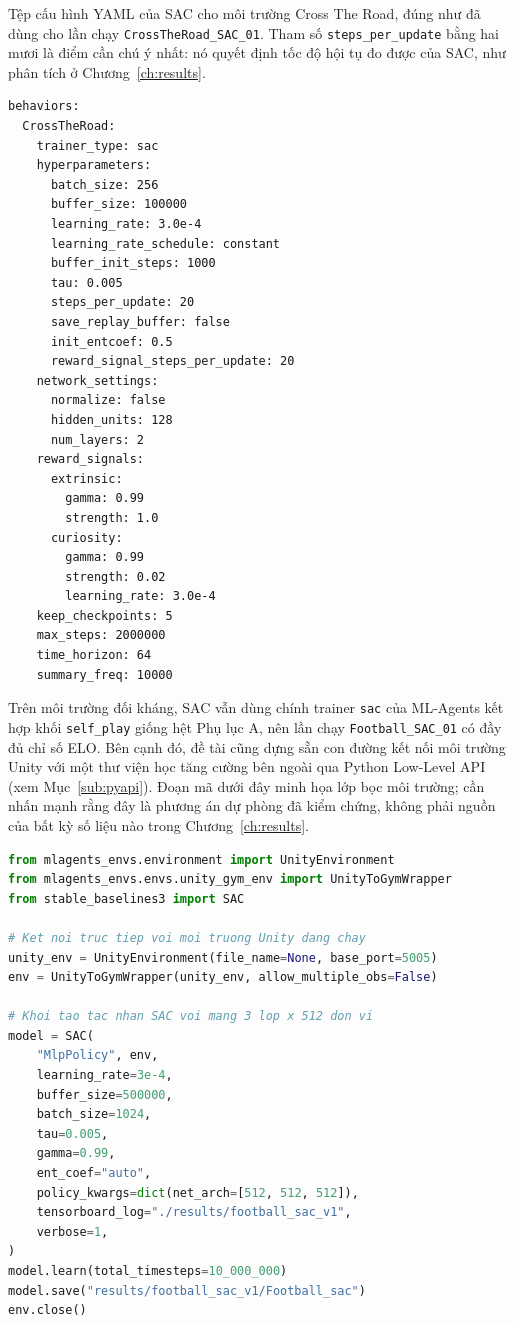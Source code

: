 Tệp cấu hình YAML của SAC cho môi trường Cross The Road, đúng như đã dùng cho lần chạy
\texttt{CrossTheRoad\_SAC\_01}. Tham số \texttt{steps\_per\_update} bằng hai mươi là
điểm cần chú ý nhất: nó quyết định tốc độ hội tụ đo được của SAC, như phân tích ở
Chương~\ref{ch:results}.

\begin{lstlisting}[basicstyle=\ttfamily\scriptsize,caption={ctr\_sac.yaml},captionpos=b]
behaviors:
  CrossTheRoad:
    trainer_type: sac
    hyperparameters:
      batch_size: 256
      buffer_size: 100000
      learning_rate: 3.0e-4
      learning_rate_schedule: constant
      buffer_init_steps: 1000
      tau: 0.005
      steps_per_update: 20
      save_replay_buffer: false
      init_entcoef: 0.5
      reward_signal_steps_per_update: 20
    network_settings:
      normalize: false
      hidden_units: 128
      num_layers: 2
    reward_signals:
      extrinsic:
        gamma: 0.99
        strength: 1.0
      curiosity:
        gamma: 0.99
        strength: 0.02
        learning_rate: 3.0e-4
    keep_checkpoints: 5
    max_steps: 2000000
    time_horizon: 64
    summary_freq: 10000
\end{lstlisting}

Trên môi trường đối kháng, SAC vẫn dùng chính trainer \texttt{sac} của ML-Agents kết hợp
khối \texttt{self\_play} giống hệt Phụ lục A, nên lần chạy \texttt{Football\_SAC\_01} có
đầy đủ chỉ số ELO. Bên cạnh đó, đề tài cũng dựng sẵn con đường kết nối môi trường Unity
với một thư viện học tăng cường bên ngoài qua Python Low-Level API (xem
Mục~\ref{sub:pyapi}). Đoạn mã dưới đây minh họa lớp bọc môi trường; cần nhấn mạnh rằng
đây là phương án dự phòng đã kiểm chứng, không phải nguồn của bất kỳ số liệu nào trong
Chương~\ref{ch:results}.

\begin{lstlisting}[language=Python,caption={Kết nối môi trường Unity với mlagents\_envs + Stable-Baselines3},captionpos=b]
from mlagents_envs.environment import UnityEnvironment
from mlagents_envs.envs.unity_gym_env import UnityToGymWrapper
from stable_baselines3 import SAC

# Ket noi truc tiep voi moi truong Unity dang chay
unity_env = UnityEnvironment(file_name=None, base_port=5005)
env = UnityToGymWrapper(unity_env, allow_multiple_obs=False)

# Khoi tao tac nhan SAC voi mang 3 lop x 512 don vi
model = SAC(
    "MlpPolicy", env,
    learning_rate=3e-4,
    buffer_size=500000,
    batch_size=1024,
    tau=0.005,
    gamma=0.99,
    ent_coef="auto",
    policy_kwargs=dict(net_arch=[512, 512, 512]),
    tensorboard_log="./results/football_sac_v1",
    verbose=1,
)
model.learn(total_timesteps=10_000_000)
model.save("results/football_sac_v1/Football_sac")
env.close()
\end{lstlisting}


